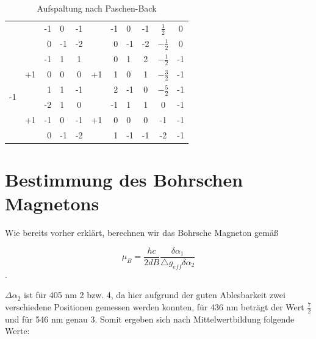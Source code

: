 \documentclass[bigchapter,colorback,accentcolor=tud4b,linedtoc,11pt]{tudreport}
\begin{document}
\begin{table}[H]
\begin{center}
\begin{tabular}{|c||c|r@{|}l|c||c|r@{|}l|c||c|c|}
                         &                     & -1    & 0     & -1              &                     & -1     & 0      & -1                & $\frac{1}{2}$  & 0           \\ 
                         &                     & 0     & -1    & -2              &                     & 0      & -1     & -2                & $-\frac{1}{2}$ & 0           \\ \hline
     \multirow{6}{*}{-1} & \multirow{3}{*}{+1} & -1    & 1     & 1               & \multirow{3}{*}{+1} & 0      & 1      & 2                 & $-\frac{1}{2}$ & -1          \\ 
                         &                     & 0     & 0     & 0               &                     & 1      & 0      & 1                 & $-\frac{3}{2}$ & -1          \\ 
                         &                     & 1     & 1     & -1              &                     & 2      & -1     & 0                 & $-\frac{5}{2}$ & -1          \\ \cline{2-11}
                         & \multirow{3}{*}{+1} & -2    & 1     & 0               & \multirow{3}{*}{+1} & -1     & 1      & 1                 & 0              & -1          \\ 
                         &                     & -1    & 0     & -1              &                     & 0      & 0      & 0                 & -1             & -1          \\ 
                         &                     & 0     & -1    & -2              &                     & 1      & -1     & -1                & -2             & -1          \\ \hline
    \end{tabular}
    \caption{Aufspaltung nach Paschen-Back}
  \end{center}
\end{table}

\section{Bestimmung des Bohrschen Magnetons}

Wie bereits vorher erklärt, berechnen wir das Bohrsche Magneton gemäß

$$\mu_{B}=\frac{hc}{2dB}\frac{\delta\alpha_{1}}{\triangle g_{eff}\delta\alpha_{2}}$$.

$\Delta \alpha_2$ ist für 405 nm 2 bzw. 4, da hier aufgrund der guten Ablesbarkeit zwei verschiedene Positionen gemessen werden konnten, für 436 nm beträgt der Wert $\frac{7}{2}$ und für 546 nm genau 3. Somit ergeben sich nach Mittelwertbildung folgende Werte:
\end{document}
